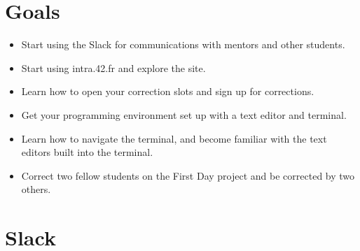 \documentclass{42-en}
\begin{document}
\startexercices



\chapter{Goals}

\begin{itemize}

	\item Start using the Slack for communications with mentors and other students.

	\item Start using intra.42.fr and explore the site.

	\item Learn how to open your correction slots and sign up for corrections.

	\item Get your programming environment set up with a text editor and terminal.

	\item Learn how to navigate the terminal, and become familiar with the text editors built into the terminal.

	\item Correct two fellow students on the First Day project and be corrected by two others.


\end{itemize}


\chapter{Slack}
\end{document}
